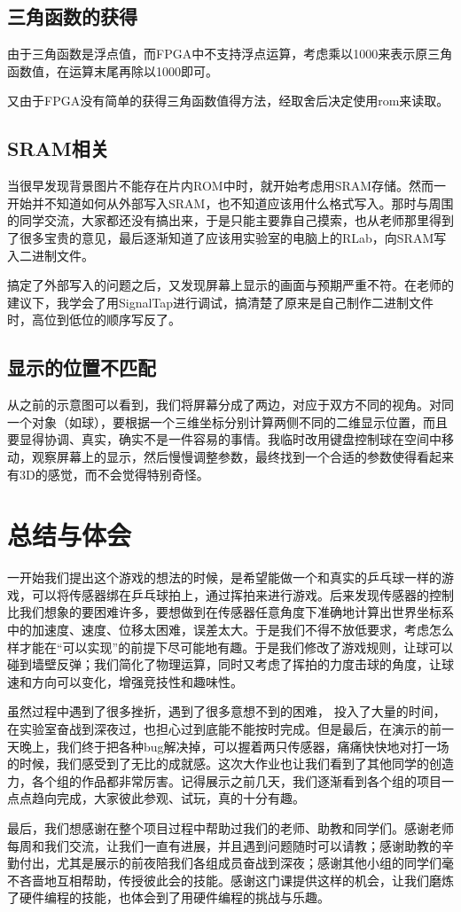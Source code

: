 \documentclass[UTF8]{article}
\begin{document}
\subsection{三角函数的获得}
由于三角函数是浮点值，而FPGA中不支持浮点运算，考虑乘以1000来表示原三角函数值，在运算末尾再除以1000即可。\par
又由于FPGA没有简单的获得三角函数值得方法，经取舍后决定使用rom来读取。

\subsection{SRAM相关}
当很早发现背景图片不能存在片内ROM中时，就开始考虑用SRAM存储。然而一开始并不知道如何从外部写入SRAM，也不知道应该用什么格式写入。那时与周围的同学交流，大家都还没有搞出来，于是只能主要靠自己摸索，也从老师那里得到了很多宝贵的意见，最后逐渐知道了应该用实验室的电脑上的RLab，向SRAM写入二进制文件。

搞定了外部写入的问题之后，又发现屏幕上显示的画面与预期严重不符。在老师的建议下，我学会了用SignalTap进行调试，搞清楚了原来是自己制作二进制文件时，高位到低位的顺序写反了。

\subsection{显示的位置不匹配}
从之前的示意图可以看到，我们将屏幕分成了两边，对应于双方不同的视角。对同一个对象（如球），要根据一个三维坐标分别计算两侧不同的二维显示位置，而且要显得协调、真实，确实不是一件容易的事情。我临时改用键盘控制球在空间中移动，观察屏幕上的显示，然后慢慢调整参数，最终找到一个合适的参数使得看起来有3D的感觉，而不会觉得特别奇怪。

\section{总结与体会}
一开始我们提出这个游戏的想法的时候，是希望能做一个和真实的乒乓球一样的游戏，可以将传感器绑在乒乓球拍上，通过挥拍来进行游戏。后来发现传感器的控制比我们想象的要困难许多，要想做到在传感器任意角度下准确地计算出世界坐标系中的加速度、速度、位移太困难，误差太大。于是我们不得不放低要求，考虑怎么样才能在“可以实现”的前提下尽可能地有趣。于是我们修改了游戏规则，让球可以碰到墙壁反弹；我们简化了物理运算，同时又考虑了挥拍的力度击球的角度，让球速和方向可以变化，增强竞技性和趣味性。

虽然过程中遇到了很多挫折，遇到了很多意想不到的困难， 投入了大量的时间，在实验室奋战到深夜过，也担心过到底能不能按时完成。但是最后，在演示的前一天晚上，我们终于把各种bug解决掉，可以握着两只传感器，痛痛快快地对打一场的时候，我们感受到了无比的成就感。这次大作业也让我们看到了其他同学的创造力，各个组的作品都非常厉害。记得展示之前几天，我们逐渐看到各个组的项目一点点趋向完成，大家彼此参观、试玩，真的十分有趣。

最后，我们想感谢在整个项目过程中帮助过我们的老师、助教和同学们。感谢老师每周和我们交流，让我们一直有进展，并且遇到问题随时可以请教；感谢助教的辛勤付出，尤其是展示的前夜陪我们各组成员奋战到深夜；感谢其他小组的同学们毫不吝啬地互相帮助，传授彼此会的技能。感谢这门课提供这样的机会，让我们磨炼了硬件编程的技能，也体会到了用硬件编程的挑战与乐趣。
\end{document}
